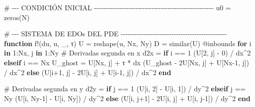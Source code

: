 \documentclass[
  spanish,
  us-letterpaper,
  DIV=11,
  numbers=noendperiod]{scrreprt}
\newenvironment{Shaded}{\begin{snugshade}}{\end{snugshade}}
\newcommand{\CommentTok}[1]{\textcolor[rgb]{0.37,0.37,0.37}{#1}}
\newcommand{\ControlFlowTok}[1]{\textcolor[rgb]{0.00,0.23,0.31}{\textbf{#1}}}
\newcommand{\FloatTok}[1]{\textcolor[rgb]{0.68,0.00,0.00}{#1}}
\newcommand{\FunctionTok}[1]{\textcolor[rgb]{0.28,0.35,0.67}{#1}}
\newcommand{\KeywordTok}[1]{\textcolor[rgb]{0.00,0.23,0.31}{\textbf{#1}}}
\newcommand{\NormalTok}[1]{\textcolor[rgb]{0.00,0.23,0.31}{#1}}
\newcommand{\OperatorTok}[1]{\textcolor[rgb]{0.37,0.37,0.37}{#1}}
\newcommand{\PreprocessorTok}[1]{\textcolor[rgb]{0.68,0.00,0.00}{#1}}
\theoremstyle{definition}
\theoremstyle{plain}
\theoremstyle{remark}
\begin{document}
\begin{Shaded}
\begin{Highlighting}[]
\CommentTok{\# {-}{-}{-} CONDICIÓN INICIAL {-}{-}{-}{-}{-}{-}{-}{-}{-}{-}{-}{-}{-}{-}{-}{-}{-}{-}{-}{-}{-}{-}{-}{-}{-}{-}{-}{-}{-}{-}{-}{-}{-}{-}{-}{-}{-}{-}{-}{-}{-}{-}{-}{-}{-}{-}{-}{-}{-}{-}{-}{-}}
\NormalTok{u0 }\OperatorTok{=} \FunctionTok{zeros}\NormalTok{(N)}

\CommentTok{\# {-}{-}{-} SISTEMA DE EDOs DEL PDE {-}{-}{-}{-}{-}{-}{-}{-}{-}{-}{-}{-}{-}{-}{-}{-}{-}{-}{-}{-}{-}{-}{-}{-}{-}{-}{-}{-}{-}{-}{-}{-}{-}{-}{-}{-}{-}{-}{-}{-}{-}{-}{-}{-}{-}{-}}
\KeywordTok{function} \FunctionTok{f!}\NormalTok{(du, u, \_, τ)}
\NormalTok{    U }\OperatorTok{=} \FunctionTok{reshape}\NormalTok{(u, Nx, Ny)}
\NormalTok{    D }\OperatorTok{=} \FunctionTok{similar}\NormalTok{(U)}
    \PreprocessorTok{@inbounds} \ControlFlowTok{for}\NormalTok{ i }\KeywordTok{in} \FloatTok{1}\OperatorTok{:}\NormalTok{Nx, j }\KeywordTok{in} \FloatTok{1}\OperatorTok{:}\NormalTok{Ny}
        \CommentTok{\# Derivadas segunda en x}
\NormalTok{        d2x }\OperatorTok{=} \ControlFlowTok{if}\NormalTok{ i }\OperatorTok{==} \FloatTok{1}
\NormalTok{            (U[}\FloatTok{2}\NormalTok{, j] }\OperatorTok{{-}} \FloatTok{0}\NormalTok{) }\OperatorTok{/}\NormalTok{ dx}\OperatorTok{\^{}}\FloatTok{2}
        \ControlFlowTok{elseif}\NormalTok{ i }\OperatorTok{==}\NormalTok{ Nx}
\NormalTok{            U\_ghost }\OperatorTok{=}\NormalTok{ U[Nx, j] }\OperatorTok{+}\NormalTok{ τ }\OperatorTok{*}\NormalTok{ dx}
\NormalTok{            (U\_ghost }\OperatorTok{{-}} \FloatTok{2}\NormalTok{U[Nx, j] }\OperatorTok{+}\NormalTok{ U[Nx}\OperatorTok{{-}}\FloatTok{1}\NormalTok{, j]) }\OperatorTok{/}\NormalTok{ dx}\OperatorTok{\^{}}\FloatTok{2}
        \ControlFlowTok{else}
\NormalTok{            (U[i}\OperatorTok{+}\FloatTok{1}\NormalTok{, j] }\OperatorTok{{-}} \FloatTok{2}\NormalTok{U[i, j] }\OperatorTok{+}\NormalTok{ U[i}\OperatorTok{{-}}\FloatTok{1}\NormalTok{, j]) }\OperatorTok{/}\NormalTok{ dx}\OperatorTok{\^{}}\FloatTok{2}
        \ControlFlowTok{end}

        \CommentTok{\# Derivadas segunda en y}
\NormalTok{        d2y }\OperatorTok{=} \ControlFlowTok{if}\NormalTok{ j }\OperatorTok{==} \FloatTok{1}
\NormalTok{            (U[i, }\FloatTok{2}\NormalTok{] }\OperatorTok{{-}}\NormalTok{ U[i, }\FloatTok{1}\NormalTok{]) }\OperatorTok{/}\NormalTok{ dy}\OperatorTok{\^{}}\FloatTok{2}
        \ControlFlowTok{elseif}\NormalTok{ j }\OperatorTok{==}\NormalTok{ Ny}
\NormalTok{            (U[i, Ny}\OperatorTok{{-}}\FloatTok{1}\NormalTok{] }\OperatorTok{{-}}\NormalTok{ U[i, Ny]) }\OperatorTok{/}\NormalTok{ dy}\OperatorTok{\^{}}\FloatTok{2}
        \ControlFlowTok{else}
\NormalTok{            (U[i, j}\OperatorTok{+}\FloatTok{1}\NormalTok{] }\OperatorTok{{-}} \FloatTok{2}\NormalTok{U[i, j] }\OperatorTok{+}\NormalTok{ U[i, j}\OperatorTok{{-}}\FloatTok{1}\NormalTok{]) }\OperatorTok{/}\NormalTok{ dy}\OperatorTok{\^{}}\FloatTok{2}
        \ControlFlowTok{end}


\end{Highlighting}
\end{Shaded}
\end{document}
